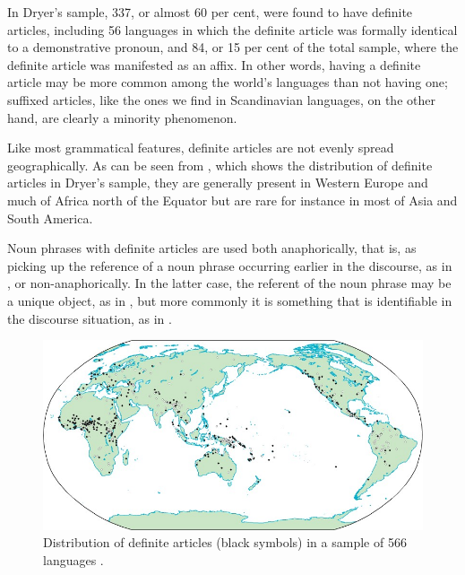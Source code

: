 In Dryer’s sample, 337, or almost 60 per cent, were found to have definite articles, including 56 languages in which the definite article was formally identical to a demonstrative pronoun, and 84, or 15 per cent of the total sample, where the definite article was manifested as an affix. In other words, having a definite article may be more common among the world’s languages than not having one; suffixed articles, like the ones we find in Scandinavian languages, on the other hand, are clearly a minority phenomenon. 

Like most grammatical features, definite articles are not evenly spread geographically. As can be seen from , which shows the distribution of definite articles in Dryer’s sample, they are generally present in Western Europe and much of Africa north of the Equator but are rare for instance in most of Asia and South America.

Noun phrases with definite articles are used both anaphorically, that is, as picking up the reference of a noun phrase occurring earlier in the discourse, as in , or non-anaphorically. In the latter case, the referent of the noun phrase may be a unique object, as in , but more commonly it is something that is identifiable in the discourse situation, as in .

\begin{figure}
\includegraphics[height=.3\textheight]{figures/10_DistributionDefArticles}
\caption{Distribution of definite articles (black symbols) in a sample of 566 languages \citep{Dryer2005}.}
\label{map:8}
\end{figure}
 
